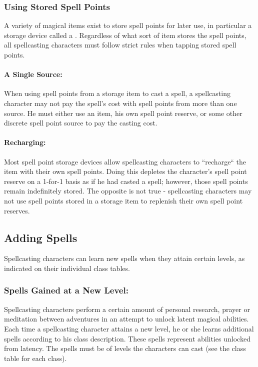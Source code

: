 \subsubsection{Using Stored Spell Points}
\label{sec:UsingStoredSpellPoints}
A variety of magical items exist to store spell points for later use, in particular a storage device called a . 
Regardless of what sort of item stores the spell points, all spellcasting characters must follow strict rules when tapping stored spell points.

\paragraph{A Single Source:} When using spell points from a storage item to cast a spell, a spellcasting character may not pay the spell's cost with spell points from more than one source. 
He must either use an item, his own spell point reserve, or some other discrete spell point source to pay the casting cost. 

\paragraph{Recharging:} Most spell point storage devices allow spellcasting characters to ``recharge`` the item with their own spell points. 
Doing this depletes the character's spell point reserve on a 1-for-1 basis as if he had casted a spell; however, those spell points remain indefinitely stored. 
The opposite is not true - spellcasting characters may not use spell points stored in a storage item to replenish their own spell point reserves.
\subsection{Adding Spells}
Spellcasting characters can learn new spells when they attain certain levels, as indicated on their individual class tables. %

\subsubsection{Spells Gained at a New Level:} Spellcasting characters perform a certain amount of personal research, prayer or meditation between adventures in an attempt to unlock latent magical abilities.
Each time a spellcasting character attains a new level, he or she learns additional spells according to his class description. 
These spells represent abilities unlocked from latency. The spells must be of levels the characters can cast (see the class table for each class).

